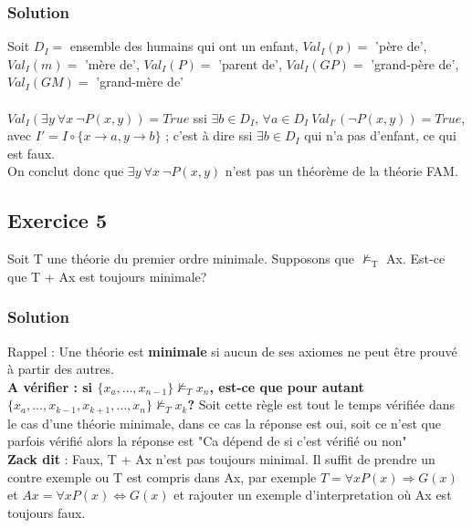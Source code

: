     \subsubsection*{Solution}
    \noindent Soit $D_I =$ ensemble des humains qui ont un enfant, $Val_I(p) = $ 'père de', $Val_I(m) = $ 'mère de', $Val_I(P) = $ 'parent de', $Val_I(GP) = $ 'grand-père de', $Val_I(GM) = $ 'grand-mère de'\\
    \\
    $Val_I (\exists y \ \forall x \ \neg P(x, y)) = True$ ssi $\exists b \in D_I$, $\forall a \in D_I \ Val_{I'}(\neg P(x, y)) = True$, avec $I' = I \circ \{x \rightarrow a, y \rightarrow b\}$ ; c'est à dire ssi $\exists b \in D_I$ qui n'a pas d'enfant, ce qui est faux.\\
    On conclut donc que $\exists y \ \forall x \ \neg P(x, y) $ n'est pas un théorème de la théorie FAM.


\subsection*{Exercice 5}
Soit T une th\'{e}orie du premier ordre minimale. Supposons que $\not\models_\text{T}$ Ax.
Est-ce que T + Ax est toujours minimale?


    \subsubsection*{Solution}
    Rappel : Une théorie est \textbf{minimale} si aucun de ses axiomes ne peut être prouvé à partir des autres.\\

\textbf{A vérifier : si $\{x_a,\dots ,x_{n-1}\} \not\models_{T} x_n$, est-ce que pour autant $\{x_a,\dots ,x_{k-1},x_{k+1},\dots ,x_n\} \not\models_{T} x_k$?}
Soit cette règle est tout le temps vérifiée dans le cas d'une théorie minimale, dans ce cas la réponse est oui, soit ce n'est que parfois vérifié alors la réponse est "Ca dépend de si c'est vérifié ou non"\\
\textbf{Zack dit} : Faux, T + Ax n'est pas toujours minimal. Il suffit de prendre un contre exemple ou T est compris dans Ax, par exemple $T=\forall x P(x) \Rightarrow G(x)$ et $Ax = \forall x P(x) \Leftrightarrow G(x)$ et rajouter un exemple d'interpretation où Ax est toujours faux.

